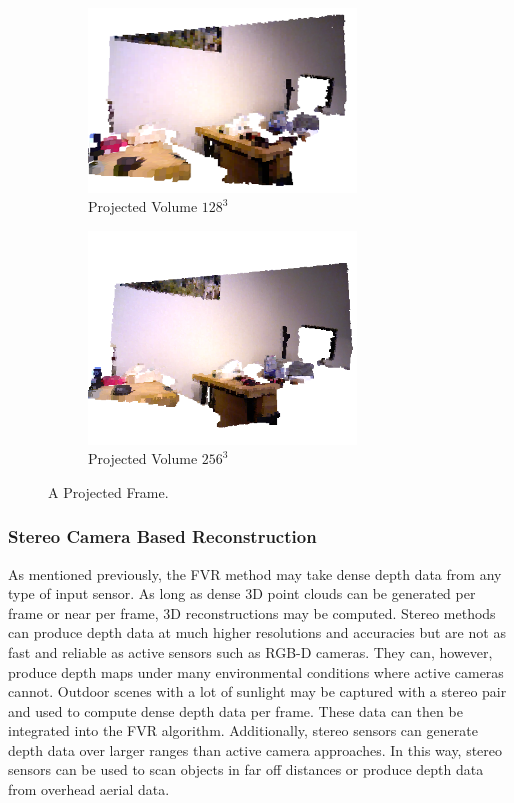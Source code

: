 \begin{figure}[!htb]
         \begin{subfigure}[b]{2.8in}
                \includegraphics[width=2.8in]{images/ch2/volumeF11128}
                \caption{Projected Volume $128^3$}
                \label{fig:VOLUMEEXAMPLE128}
        \end{subfigure}%
         \begin{subfigure}[b]{2.8in}
                \includegraphics[width=2.8in]{images/ch2/volumeF11256}
                \caption{Projected Volume $256^3$}
                \label{fig:VOLUMEEXAMPLE384}
        \end{subfigure}%
       \caption{A Projected Frame.}
       \label{fig:PROJECTED_FRAME}
\end{figure}

\subsubsection{Stereo Camera Based Reconstruction}
\label{subsec:SCBR}
As mentioned previously, the FVR method may take dense depth data from any type of input sensor. As long as dense 3D point clouds can be generated per frame or near per frame, 3D reconstructions may be computed. Stereo methods can produce depth data at much higher resolutions and accuracies but are not as fast and reliable as active sensors such as RGB-D cameras. They can, however, produce depth maps under many environmental conditions where active cameras cannot. Outdoor scenes with a lot of sunlight may be captured with a stereo pair and used to compute dense depth data per frame. These data can then be integrated into the FVR algorithm. Additionally, stereo sensors can generate depth data over larger ranges than active camera approaches. In this way, stereo sensors can be used to scan objects in far off distances or produce depth data from overhead aerial data. \\

